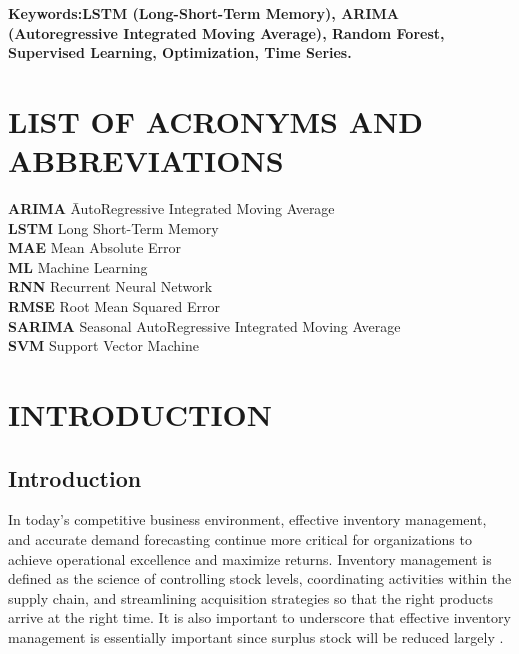 \documentclass[10pt]{report}
\begin{document}
\begin{center}
\noindent \textbf{Keywords:LSTM (Long-Short-Term Memory), ARIMA (Autoregressive Integrated Moving Average), Random Forest, Supervised Learning, Optimization, Time Series.}

\newpage
\renewcommand*\listfigurename{LIST OF FIGURES}
\listoffigures
\newpage
\renewcommand{\listtablename}{LIST OF TABLES}

\chapter*{LIST OF ACRONYMS AND ABBREVIATIONS}


\begin{abbrv}
\begin{tabbing}
    \textbf{ARIMA} \hspace{1cm} \= AutoRegressive Integrated Moving Average \\
    \textbf{LSTM} \> Long Short-Term Memory \\
    \textbf{MAE} \> Mean Absolute Error \\
    \textbf{ML} \> Machine Learning \\
    \textbf{RNN} \> Recurrent Neural Network \\
    \textbf{RMSE} \> Root Mean Squared Error \\
    \textbf{SARIMA} \> Seasonal AutoRegressive Integrated Moving Average \\
    \textbf{SVM} \> Support Vector Machine \\
\end{tabbing}
\end{abbrv}
\newpage
\renewcommand*\contentsname{TABLE OF CONTENTS}
\tableofcontents
{}
\thispagestyle{empty}
\chapter{INTRODUCTION}

\section{Introduction}
\hspace{0.5cm}In today's competitive business environment, effective inventory management, and accurate demand forecasting continue more critical for organizations to achieve operational excellence and maximize returns. Inventory management is defined as the science of controlling stock levels, coordinating activities within the supply chain, and streamlining acquisition strategies so that the right products arrive at the right time. It is also important to underscore that effective inventory management is essentially important since surplus stock will be reduced largely .\\


\end{center}
\end{document}
